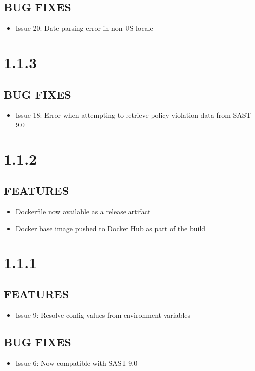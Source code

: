 \subsection*{BUG FIXES}
    \begin{itemize}
        \item Issue 20: Date parsing error in non-US locale
    \end{itemize}

\section{1.1.3}
\subsection*{BUG FIXES}
    \begin{itemize}
        \item Issue 18: Error when attempting to retrieve policy violation data from SAST 9.0
    \end{itemize}


\section{1.1.2}
\subsection*{FEATURES}
    \begin{itemize}
        \item Dockerfile now available as a release artifact
        \item Docker base image pushed to Docker Hub as part of the build 
    \end{itemize}

\section{1.1.1}
\subsection*{FEATURES}
    \begin{itemize}
        \item Issue 9: Resolve config values from environment variables        
    \end{itemize}
\subsection*{BUG FIXES}
    \begin{itemize}
        \item Issue 6: Now compatible with SAST 9.0
    \end{itemize}

